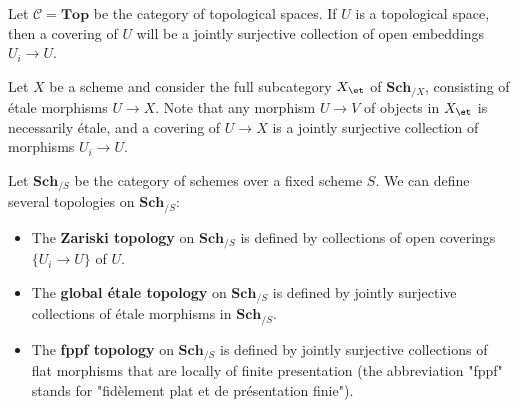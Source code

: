 \begin{example}
Let $\mathcal{C}=\mathbf{Top}$ be the category of topological spaces. If $U$ is a topological space, then a covering of $U$ will be a jointly surjective collection of open embeddings $U_i\to U$.
\end{example}
\begin{example}
Let $X$ be a scheme and consider the full subcategory $X_{\et}$ of $\mathbf{Sch}_{/X}$, consisting of \'etale morphisms $U\to X$. Note that any morphism $U\to V$ of objects in $X_{\et}$ is necessarily \'etale, and a covering of $U\to X$ is a jointly surjective collection of morphisms $U_i\to U$.
\end{example}
\begin{example}
Let $\mathbf{Sch}_{/S}$ be the category of schemes over a fixed scheme $S$. We can define several topologies on $\mathbf{Sch}_{/S}$:
\begin{itemize}
\item The \textbf{Zariski topology} on $\mathbf{Sch}_{/S}$ is defined by collections of open coverings $\{U_i\to U\}$ of $U$.
\item The \textbf{global \'etale topology} on $\mathbf{Sch}_{/S}$ is defined by jointly surjective collections of \'etale morphisms in $\mathbf{Sch}_{/S}$.
\item The \textbf{fppf topology} on $\mathbf{Sch}_{/S}$ is defined by jointly surjective collections of flat morphisms that are locally of finite presentation (the abbreviation "fppf" stands for "fid\`element plat et de pr\'esentation finie").
\end{itemize}
\end{example}

